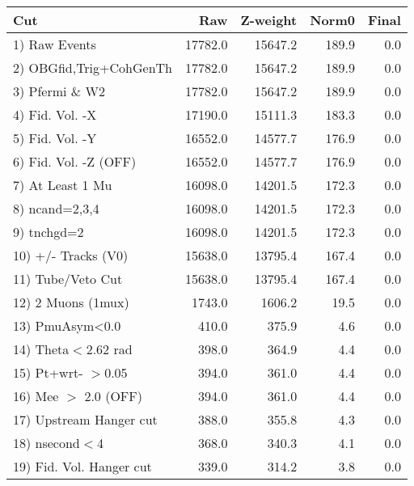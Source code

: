  \begin{table}[h!]\centering
 \begin{tabular}{||l||r|r|r|r||}
 \hline
 \hline
 Cut & Raw & Z-weight & Norm0 & Final \\
 \hline
  1) Raw Events           &     17782.0 &     15647.2 &       189.9 &         0.0 \\
  2) OBGfid,Trig+CohGenTh &     17782.0 &     15647.2 &       189.9 &         0.0 \\
  3) Pfermi \& W2         &     17782.0 &     15647.2 &       189.9 &         0.0 \\
  4) Fid. Vol. -X         &     17190.0 &     15111.3 &       183.3 &         0.0 \\
  5) Fid. Vol. -Y         &     16552.0 &     14577.7 &       176.9 &         0.0 \\
  6) Fid. Vol. -Z (OFF)   &     16552.0 &     14577.7 &       176.9 &         0.0 \\
  7) At Least 1 Mu        &     16098.0 &     14201.5 &       172.3 &         0.0 \\
  8) ncand=2,3,4          &     16098.0 &     14201.5 &       172.3 &         0.0 \\
  9) tnchgd=2             &     16098.0 &     14201.5 &       172.3 &         0.0 \\
 10) +/- Tracks (V0)      &     15638.0 &     13795.4 &       167.4 &         0.0 \\
 11) Tube/Veto Cut        &     15638.0 &     13795.4 &       167.4 &         0.0 \\
 12) 2 Muons (1mux)       &      1743.0 &      1606.2 &        19.5 &         0.0 \\
 13) PmuAsym<0.0          &       410.0 &       375.9 &         4.6 &         0.0 \\
 14) Theta$<$2.62 rad     &       398.0 &       364.9 &         4.4 &         0.0 \\
 15) Pt+wrt- $>$0.05      &       394.0 &       361.0 &         4.4 &         0.0 \\
 16) Mee $>$ 2.0  (OFF)   &       394.0 &       361.0 &         4.4 &         0.0 \\
 17) Upstream Hanger cut  &       388.0 &       355.8 &         4.3 &         0.0 \\
 18) nsecond$<$4          &       368.0 &       340.3 &         4.1 &         0.0 \\
 19) Fid. Vol. Hanger cut &       339.0 &       314.2 &         3.8 &         0.0 \\

\end{tabular}
\end{table}
